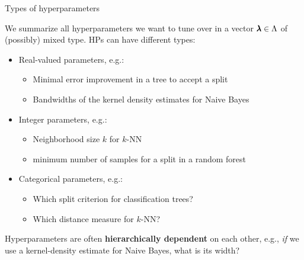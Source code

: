 \begin{frame}{Types of hyperparameters}

We summarize all hyperparameters we want to tune over in a vector $\pmb{\lambda} \in \Lambda$ of (possibly) mixed type. HPs can have different types:

\begin{itemize}
\item Real-valued parameters, e.g.:
\begin{itemize}
\item Minimal error improvement in a tree to accept a split
\item Bandwidths of the kernel density estimates for Naive Bayes
\end{itemize}
\item Integer parameters, e.g.:
\begin{itemize}
\item Neighborhood size $k$ for $k$-NN
\item minimum number of samples for a split in a random forest
\end{itemize}
\item Categorical parameters, e.g.:
\begin{itemize}
\item Which split criterion for classification trees?
\item Which distance measure for $k$-NN?
\end{itemize}
\end{itemize}

Hyperparameters are often \textbf{hierarchically dependent} on each other, e.g., \emph{if} we use
a kernel-density estimate for Naive Bayes, what is its width?
\end{frame}

